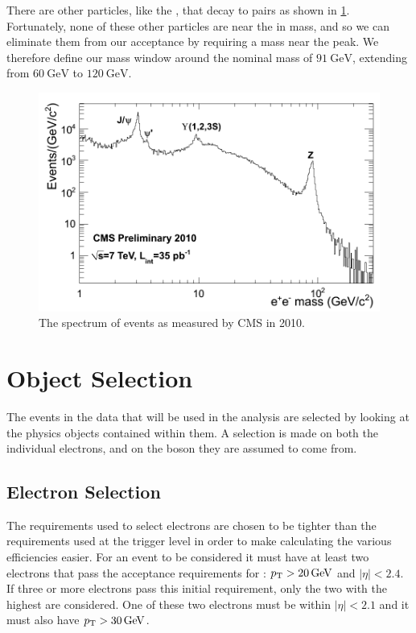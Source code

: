 There are other particles, like the \jpsi, that decay to \ee pairs as shown in
\cref{fig:ee_spectrum}. Fortunately, none of these other particles are near the
\Z in mass, and so we can eliminate them from our acceptance by requiring a
mass near the \Z peak. We therefore define our mass window around the nominal
\Z mass of $\SI{91}{\GeV}$, extending from $\SI{60}{\GeV}$ to $\SI{120}{\GeV}$.

\begin{figure}[!htbp]
    \centering
    \includegraphics[width=\textwidth]{figures/dielectron_mass_7tev.png}
    \caption{
        The spectrum of \ee events as measured by CMS in 2010.
    }
    \label{fig:ee_spectrum}
\end{figure}

\section{Object Selection}

The events in the data that will be used in the analysis are selected by
looking at the physics objects contained within them. A selection is made on
both the individual electrons, and on the \Z boson they are assumed to come
from.

\subsection{Electron Selection}
\label{ssec:electron_selection}

The requirements used to select electrons are chosen to be tighter than the
requirements used at the trigger level in order to make calculating the various
efficiencies easier. For an event to be considered it must have at least two
electrons that pass the acceptance requirements for \ExtendedElectrons: $\pt >
\SI{20}{\GeV}$ and $|\eta| < 2.4$. If three or more electrons pass this initial
requirement, only the two with the highest \pt are considered. One of these two
electrons must be within $|\eta| < 2.1$ and it must also have $\pt >
\SI{30}{\GeV}$.

